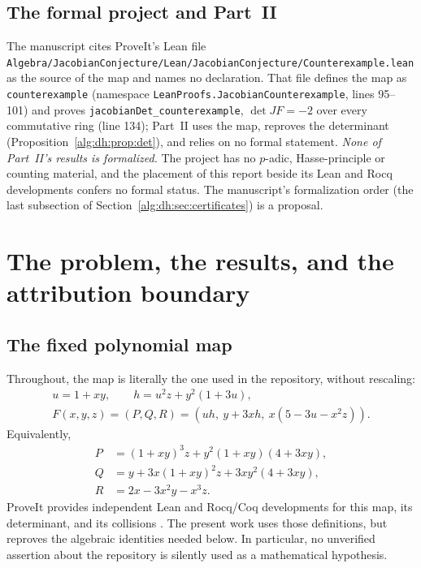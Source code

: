 \documentclass[11pt]{article}
\numberwithin{equation}{section}
\theoremstyle{plain}
\theoremstyle{plain}
\theoremstyle{plain}
\theoremstyle{definition}
\theoremstyle{definition}
\theoremstyle{definition}
\theoremstyle{remark}
\newcommand{\rpath}[1]{\nolinkurl{#1}}
\begin{document}
\subsection{The formal project and Part~II}\label{alg:dh:sec:formal}
The manuscript cites ProveIt's Lean file
\rpath{Algebra/JacobianConjecture/Lean/JacobianConjecture/Counterexample.lean}
\cite{dh:proveitformal} as the source of the map and names no
declaration. That file defines the map as \texttt{counterexample}
(namespace \texttt{LeanProofs.JacobianCounterexample}, lines 95--101) and
proves \texttt{jacobianDet\_counterexample}, $\det JF=-2$ over every
commutative ring (line 134); Part~II uses the map, reproves the
determinant (Proposition~\ref{alg:dh:prop:det}), and relies on no formal
statement. \emph{None of Part~II's results is formalized.} The project
has no $p$-adic, Hasse-principle or counting material, and the placement
of this report beside its Lean and Rocq developments confers no formal
status. The manuscript's formalization order (the last subsection of
Section~\ref{alg:dh:sec:certificates}) is a proposal.

\section{The problem, the results, and the attribution boundary}\label{alg:dh:sec:intro}

\subsection{The fixed polynomial map}
Throughout, the map is literally the one used in the repository, without
rescaling:
\begin{equation}\label{alg:dh:eq:F}
\begin{gathered}
 u=1+xy,\qquad h=u^2z+y^2(1+3u),\\
 F(x,y,z)=(P,Q,R)=(uh,\ y+3xh,\ x(5-3u-x^2z)).
\end{gathered}
\end{equation}
Equivalently,
\begin{align*}
 P&=(1+xy)^3z+y^2(1+xy)(4+3xy),\\
 Q&=y+3x(1+xy)^2z+3xy^2(4+3xy),\\
 R&=2x-3x^2y-x^3z.
\end{align*}
ProveIt provides independent Lean and Rocq/Coq developments for this map,
its determinant, and its collisions \cite{dh:proveitformal}. The present
work uses those definitions, but reproves the algebraic identities needed
below. In particular, no unverified assertion about the repository is
silently used as a mathematical hypothesis.
\end{document}
